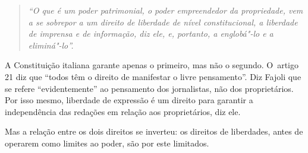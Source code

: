 \begin{quote}
\emph{``O que é um poder patrimonial, o poder empreendedor da
propriedade, vem a se sobrepor a um direito de liberdade de nível
constitucional, a liberdade de imprensa e de informação, diz ele, e,
portanto, a englobá"-lo e a eliminá"-lo''.}
\end{quote}

A Constituição italiana garante apenas o primeiro, mas não o segundo. O~artigo 21 diz que ``todos têm o direito de manifestar o livre
pensamento''. Diz Fajoli que se refere ``evidentemente'' ao pensamento
dos jornalistas, não dos proprietários. Por isso mesmo, liberdade de
expressão é um direito para garantir a independência das redações em
relação aos proprietários, diz ele.

Mas a relação entre os dois direitos se inverteu: os direitos de
liberdades, antes de operarem como limites ao poder, são por este
limitados.
